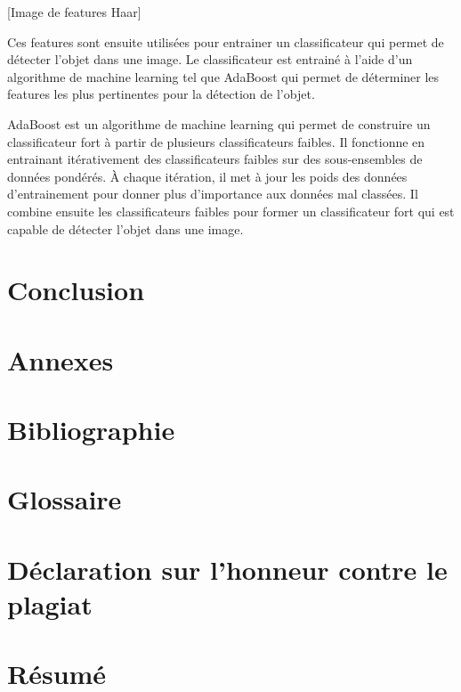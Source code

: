 \documentclass[11pt]{article}
\begin{document}
[Image de features Haar]

Ces features sont ensuite utilisées pour entrainer un classificateur qui permet de détecter l'objet dans une image. Le classificateur est entrainé à l'aide d'un algorithme de machine learning tel que AdaBoost qui permet de déterminer les features les plus pertinentes pour la détection de l'objet. \bigbreak

AdaBoost est un algorithme de machine learning qui permet de construire un classificateur fort à partir de plusieurs classificateurs faibles. Il fonctionne en entrainant itérativement des classificateurs faibles sur des sous-ensembles de données pondérés. À chaque itération, il met à jour les poids des données d'entrainement pour donner plus d'importance aux données mal classées. Il combine ensuite les classificateurs faibles pour former un classificateur fort qui est capable de détecter l'objet dans une image. \bigbreak

\section*{Conclusion}
\newpage

\section*{Annexes}

\section*{Bibliographie}
\newpage

\section*{Glossaire}

\section*{Déclaration sur l'honneur contre le plagiat}

\newpage

\newpage
\section*{Résumé}
\end{document}
